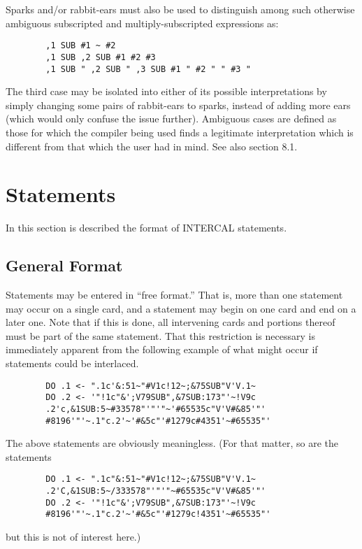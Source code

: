 Sparks and/or rabbit-ears must also be used to distinguish among such
otherwise ambiguous subscripted and multiply-subscripted expressions as:

\begin{verbatim} 
        ,1 SUB #1 ~ #2
        ,1 SUB ,2 SUB #1 #2 #3
        ,1 SUB " ,2 SUB " ,3 SUB #1 " #2 " " #3 "
\end{verbatim}

The third case may be isolated into either of its possible interpretations
by simply changing some pairs of rabbit-ears to sparks, instead of adding
more ears (which would only confuse the issue further).  Ambiguous cases
are defined as those for which the compiler being used finds a legitimate
interpretation which is different from that which the user had in mind.
See also section 8.1.






\section{Statements}

In this section is described the format of INTERCAL statements.

\subsection{General Format}

Statements may be entered in ``free format.''  That is, more than one
statement may occur on a single card, and a statement may begin on one card
and end on a later one.  Note that if this is done, all intervening cards
and portions thereof must be part of the same statement.  That this
restriction is necessary is immediately apparent from the following example
of what might occur if statements could be interlaced.

\begin{verbatim} 
        DO .1 <- ".1c'&:51~"#V1c!12~;&75SUB"V'V.1~
        DO .2 <- '"!1c"&';V79SUB",&7SUB:173"'~!V9c
        .2'c,&1SUB:5~#33578"'"'"~'#65535c"V'V#&85'"'
        #8196'"'~.1"c.2'~'#&5c"'#1279c#4351'~#65535"'
\end{verbatim} 
The above statements are obviously meaningless.  (For that matter, so are
the statements

\begin{verbatim}
        DO .1 <- ".1c"&:51~"#V1c!12~;&75SUB"V'V.1~
        .2'C,&1SUB:5~/333578"'"'"~#65535c"V'V#&85'"'
        DO .2 <- '"!1c"&';V79SUB",&7SUB:173"'~!V9c
        #8196'"'~.1"c.2'~'#&5c"'#1279c!4351'~#65535"'
\end{verbatim}
but this is not of interest here.)

